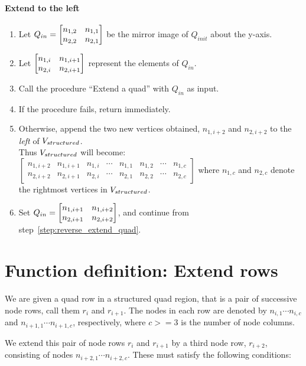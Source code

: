 \paragraph{Extend to the left}
\begin{enumerate}[resume]

\item \label{step:init_reverse} Let $Q_{in} = \begin{bmatrix} n_{1,2} & n_{1,1} \\ n_{2,2} & n_{2,1} \end{bmatrix}$ be the mirror image of $Q_{init}$ about the y-axis.



\item \label{step:reverse_extend_quad} Let $\begin{bmatrix} n_{1,i} & n_{1,i+1} \\ n_{2,i} & n_{2,i+1} \end{bmatrix}$ represent the elements of $Q_{in}$.
\item Call the procedure ``Extend a quad'' with $Q_{in}$ as input.
\item If the procedure fails, return immediately.
\item Otherwise, append the two new vertices obtained, $n_{1,i+2}$ and $n_{2,i+2}$ to the \emph{left} of $V_{structured}$. \\
Thus $V_{structured}$ will become:
	$\begin{bmatrix}
	n_{1,i+2} & n_{1,i+1} & n_{1,i} & \cdots & n_{1,1} & n_{1,2} & \cdots  & n_{1,c} \\
	n_{2,i+2} & n_{2,i+1} & n_{2,i} & \cdots & n_{2,1} & n_{2,2} & \cdots  & n_{2,c}
	\end{bmatrix}$
where $n_{1,c}$ and $n_{2,c}$ denote the rightmost vertices in $V_{structured}$.

\item Set $Q_{in} = \begin{bmatrix} n_{1,i+1} & n_{1,i+2} \\ n_{2,i+1} & n_{2,i+2} \end{bmatrix}$, and continue from step~\ref{step:reverse_extend_quad}.
\end{enumerate}






\section{Function definition: Extend rows}
We are given a quad row in a structured quad region, that is a pair of successive node rows, call them $r_i$ and $r_{i+1}$.
The nodes in each row are denoted by $n_{i,1} \cdots n_{i,c}$ and $n_{i+1,1} \cdots n_{i+1,c}$, respectively, where $c >= 3$ is the number of node columns.

We extend this pair of node rows $r_i$ and $r_{i+1}$ by a third node row, $r_{i+2}$, consisting of nodes $n_{i+2,1} \cdots n_{i+2,c}$. These must satisfy the following conditions:

